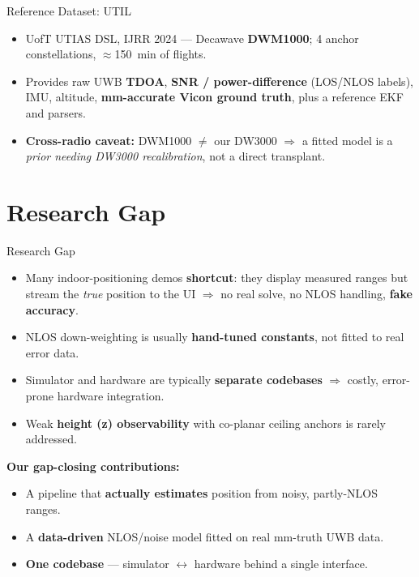 \documentclass[aspectratio=169,10pt]{beamer}
\begin{document}
\begin{frame}{Reference Dataset: UTIL}
  \begin{itemize}
    \item UofT UTIAS DSL, IJRR 2024 --- Decawave \textbf{DWM1000}; 4 anchor
          constellations, $\approx$150~min of flights.
    \item Provides raw UWB \textbf{TDOA}, \textbf{SNR / power-difference} (LOS/NLOS labels),
          IMU, altitude, \textbf{mm-accurate Vicon ground truth}, plus a reference EKF and parsers.
    \item \textbf{Cross-radio caveat:} DWM1000 $\neq$ our DW3000 $\Rightarrow$ a fitted model is a
          \emph{prior needing DW3000 recalibration}, not a direct transplant.
  \end{itemize}
\end{frame}

\section{Research Gap}
\begin{frame}{Research Gap}
  \begin{itemize}
    \item Many indoor-positioning demos \textbf{shortcut}: they display measured ranges but stream the
          \emph{true} position to the UI $\Rightarrow$ no real solve, no NLOS handling, \textbf{fake accuracy}.
    \item NLOS down-weighting is usually \textbf{hand-tuned constants}, not fitted to real error data.
    \item Simulator and hardware are typically \textbf{separate codebases} $\Rightarrow$ costly, error-prone
          hardware integration.
    \item Weak \textbf{height (z) observability} with co-planar ceiling anchors is rarely addressed.
  \end{itemize}
  \vspace{4pt}
  \textbf{Our gap-closing contributions:}
  \begin{itemize}
    \item A pipeline that \textbf{actually estimates} position from noisy, partly-NLOS ranges.
    \item A \textbf{data-driven} NLOS/noise model fitted on real mm-truth UWB data.
    \item \textbf{One codebase} --- simulator $\leftrightarrow$ hardware behind a single interface.
  \end{itemize}
\end{frame}
\end{document}
